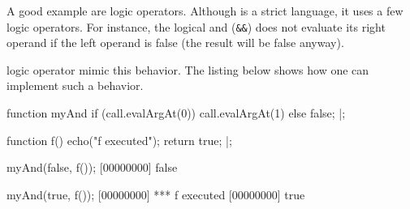 A good example are logic operators. Although \Cxx is a strict language, it
uses a few logic operators. For instance, the logical and (\lstinline{&&})
does not evaluate its right operand if the left operand is false (the result
will be false anyway).

\us logic operator mimic this behavior. The listing below shows how one can
implement such a behavior.

\begin{urbiscript}
function myAnd
{
  if (call.evalArgAt(0))
    call.evalArgAt(1)
  else
    false;
}|;

function f()
{
  echo("f executed");
  return true;
}|;

myAnd(false, f());
[00000000] false

myAnd(true, f());
[00000000] *** f executed
[00000000] true
\end{urbiscript}


